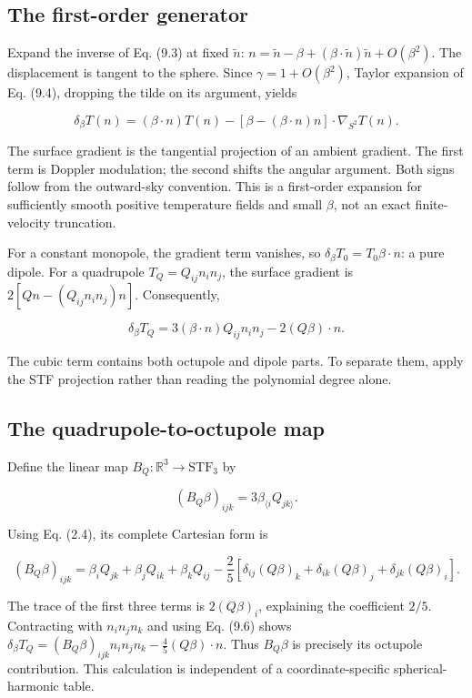 \documentclass[
  11pt,
  a4paper]{article}
\begin{document}
\hypertarget{the-first-order-generator}{%
\subsection{The first-order generator}\label{the-first-order-generator}}

Expand the inverse of Eq. (9.3) at fixed \(\widetilde n\):
\(n=\widetilde n-\beta+(\beta\cdot\widetilde n)\widetilde n+O(\beta^2)\).
The displacement is tangent to the sphere. Since \(\gamma=1+O(\beta^2)\), Taylor expansion of Eq. (9.4), dropping the tilde on its argument, yields

\[
\delta_\beta T(n)
=(\beta\cdot n)T(n)
-[\beta-(\beta\cdot n)n]\cdot\nabla_{S^2}T(n).
\tag{9.5}
\]

The surface gradient is the tangential projection of an ambient gradient. The first term is Doppler modulation; the second shifts the angular argument. Both signs follow from the outward-sky convention. This is a first-order expansion for sufficiently smooth positive temperature fields and small \(\beta\), not an exact finite-velocity truncation.

For a constant monopole, the gradient term vanishes, so \(\delta_\beta T_0=T_0\beta\cdot n\): a pure dipole. For a quadrupole \(T_Q=Q_{ij}n_in_j\), the surface gradient is
\(2[Qn-(Q_{ij}n_in_j)n]\). Consequently,

\[
\delta_\beta T_Q
=3(\beta\cdot n)Q_{ij}n_in_j-2(Q\beta)\cdot n.
\tag{9.6}
\]

The cubic term contains both octupole and dipole parts. To separate them, apply the STF projection rather than reading the polynomial degree alone.

\hypertarget{the-quadrupole-to-octupole-map}{%
\subsection{The quadrupole-to-octupole map}\label{the-quadrupole-to-octupole-map}}

Define the linear map \(B_Q:\mathbb R^3\to\mathrm{STF}_3\) by

\[
(B_Q\beta)_{ijk}=3\beta_{\langle i}Q_{jk\rangle}.
\tag{9.7}
\]

Using Eq. (2.4), its complete Cartesian form is

\[
(B_Q\beta)_{ijk}
=\beta_iQ_{jk}+\beta_jQ_{ik}+\beta_kQ_{ij}
-\frac25[\delta_{ij}(Q\beta)_k+\delta_{ik}(Q\beta)_j+\delta_{jk}(Q\beta)_i].
\tag{9.8}
\]

The trace of the first three terms is \(2(Q\beta)_i\), explaining the coefficient \(2/5\). Contracting with \(n_in_jn_k\) and using Eq. (9.6) shows
\(\delta_\beta T_Q=(B_Q\beta)_{ijk}n_in_jn_k-\tfrac45(Q\beta)\cdot n\).
Thus \(B_Q\beta\) is precisely its octupole contribution. This calculation is independent of a coordinate-specific spherical-harmonic table.
\end{document}
